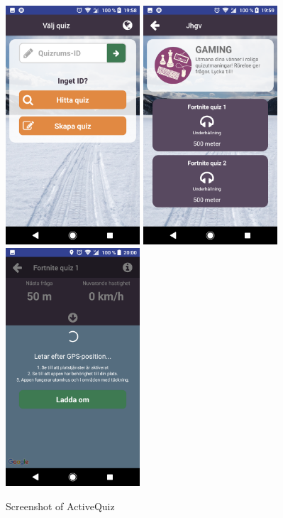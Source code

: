 \documentclass{TDP003mall}
\begin{document}
\begin{figure}[H]
\includegraphics[width=5cm]{pictures/Screenshot_Active1}
\includegraphics[width=5cm]{pictures/Screenshot_Active2}
\includegraphics[width=5cm]{pictures/Screenshot_Active3}
\centering
\caption{Screenshot of ActiveQuiz}
\end{figure}
\end{document}
